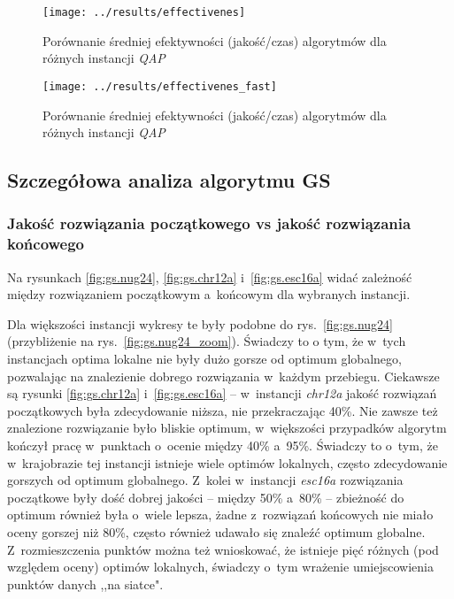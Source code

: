 \documentclass{article}
\begin{document}
			\begin{figure}[h]
				\texttt{[image: ../results/effectivenes]}
				\caption{Porównanie średniej efektywności (jakość/czas) algorytmów dla różnych instancji \emph{QAP}\label{fig:effectivenes}}
			\end{figure}

			\begin{figure}[h]
				\texttt{[image: ../results/effectivenes\_fast]}
				\caption{Porównanie średniej efektywności (jakość/czas) algorytmów dla różnych instancji \emph{QAP}\label{fig:effectivenes_fast}}
			\end{figure}


	\subsection{Szczegółowa analiza algorytmu GS}

		\subsubsection{Jakość rozwiązania początkowego vs jakość rozwiązania końcowego}
			Na rysunkach \ref{fig:gs.nug24}, \ref{fig:gs.chr12a} i~\ref{fig:gs.esc16a} widać zależność między rozwiązaniem początkowym a~końcowym dla wybranych instancji.
			
			Dla większości instancji wykresy te były podobne do rys.~\ref{fig:gs.nug24} (przybliżenie na rys.~\ref{fig:gs.nug24_zoom}). Świadczy to o tym, że w~tych instancjach optima lokalne nie były dużo gorsze od optimum globalnego, pozwalając na znalezienie dobrego rozwiązania w~każdym przebiegu. Ciekawsze są rysunki \ref{fig:gs.chr12a} i~\ref{fig:gs.esc16a} -- w~instancji \emph{chr12a} jakość rozwiązań początkowych była zdecydowanie niższa, nie przekraczając 40\%. Nie zawsze też znalezione rozwiązanie było bliskie optimum, w~większości przypadków algorytm kończył pracę w~punktach o~ocenie między 40\% a~95\%. Świadczy to o~tym, że w~krajobrazie tej instancji istnieje wiele optimów lokalnych, często zdecydowanie gorszych od optimum globalnego. Z~kolei w~instancji \emph{esc16a} rozwiązania początkowe były dość dobrej jakości -- między 50\% a~80\% -- zbieżność do optimum również była o~wiele lepsza, żadne z~rozwiązań końcowych nie miało oceny gorszej niż 80\%, często również udawało się znaleźć optimum globalne. Z~rozmieszczenia punktów można też wnioskować, że istnieje pięć różnych (pod względem oceny) optimów lokalnych, świadczy o~tym wrażenie umiejscowienia punktów danych ,,na siatce".
			
\end{document}

